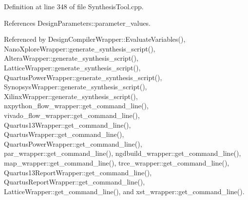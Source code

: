 Definition at line 348 of file Synthesis\+Tool.\+cpp.



References Design\+Parameters\+::parameter\+\_\+values.



Referenced by Design\+Compiler\+Wrapper\+::\+Evaluate\+Variables(), Nano\+Xplore\+Wrapper\+::generate\+\_\+synthesis\+\_\+script(), Altera\+Wrapper\+::generate\+\_\+synthesis\+\_\+script(), Lattice\+Wrapper\+::generate\+\_\+synthesis\+\_\+script(), Quartus\+Power\+Wrapper\+::generate\+\_\+synthesis\+\_\+script(), Synopsys\+Wrapper\+::generate\+\_\+synthesis\+\_\+script(), Xilinx\+Wrapper\+::generate\+\_\+synthesis\+\_\+script(), nxpython\+\_\+flow\+\_\+wrapper\+::get\+\_\+command\+\_\+line(), vivado\+\_\+flow\+\_\+wrapper\+::get\+\_\+command\+\_\+line(), Quartus13\+Wrapper\+::get\+\_\+command\+\_\+line(), Quartus\+Wrapper\+::get\+\_\+command\+\_\+line(), Quartus\+Power\+Wrapper\+::get\+\_\+command\+\_\+line(), par\+\_\+wrapper\+::get\+\_\+command\+\_\+line(), ngdbuild\+\_\+wrapper\+::get\+\_\+command\+\_\+line(), map\+\_\+wrapper\+::get\+\_\+command\+\_\+line(), trce\+\_\+wrapper\+::get\+\_\+command\+\_\+line(), Quartus13\+Report\+Wrapper\+::get\+\_\+command\+\_\+line(), Quartus\+Report\+Wrapper\+::get\+\_\+command\+\_\+line(), Lattice\+Wrapper\+::get\+\_\+command\+\_\+line(), and xst\+\_\+wrapper\+::get\+\_\+command\+\_\+line().

